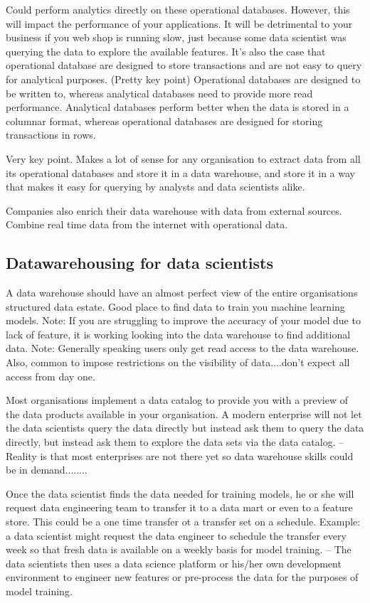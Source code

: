 \documentclass[a4paper, 11pt]{article}
\begin{document}
    Could perform analytics directly on these operational databases.
    However, this will impact the performance of your applications.
    It will be detrimental to your business if you web shop is running slow, just because some data scientist was querying the data to explore the available features.
    It's also the case that operational database are designed to store transactions and are not easy to query for analytical purposes. (Pretty key point)
    Operational databases are designed to be written to, whereas analytical databases need to provide more read performance.
    Analytical databases perform better when the data is stored in a columnar format, whereas operational databases are designed for storing transactions in rows.

    Very key point.
    Makes a lot of sense for any organisation to extract data from all its operational databases and store it in a data warehouse,
    and store it in a way that makes it easy for querying by analysts and data scientists alike.

    Companies also enrich their data warehouse with data from external sources.
    Combine real time data from the internet with operational data.

    \subsection{Datawarehousing for data scientists}

    A data warehouse should have an almost perfect view of the entire organisations structured data estate.
    Good place to find data to train you machine learning models.
    Note: If you are struggling to improve the accuracy of your model due to lack of feature, it is working looking into the data warehouse to find additional data.
    Note: Generally speaking users only get read access to the data warehouse.
    Also, common to impose restrictions on the visibility of data....don't expect all access from day one.

    Most organisations implement a data catalog to provide you with a preview of the data products available in your organisation.
    A modern enterprise will not let the data scientists query the data directly but instead ask them to query the data directly, but instead ask them to explore the data sets via the data catalog.
    -- Reality is that most enterprises are not there yet so data warehouse skills could be in demand........

    Once the data scientist finds the data needed for training models, he or she will request data engineering team to transfer it to a data mart or even to a feature store.
    This could be a one time transfer ot a transfer set on a schedule.
    Example: a data scientist might request the data engineer to schedule the transfer every week so that fresh data is available on a weekly basis for model training.
    -- The data scientists then uses a data science platform or his/her own development environment to engineer new features or pre-process the data for the purposes of model training.
\end{document}
